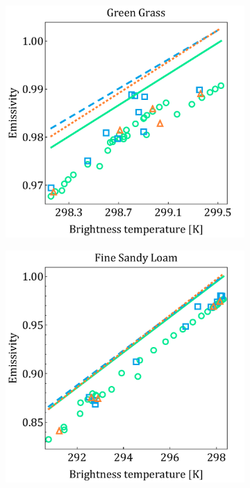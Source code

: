 \begin{figure}[htb]
	\centering
	\vspace{1em}
	\begin{subfigure}[t]{.3\linewidth}
		\centering
		\includegraphics[scale=0.3]{pics/Chapter_03/pivov2.pdf}
		\vspace{-0.1cm}
		\caption{}
		\label{fig:BBradiation}
	\end{subfigure}
	\hspace{1em}
	\begin{subfigure}[t]{.3\linewidth}
		\centering
		\includegraphics[scale=0.3]{pics/Chapter_03/pivov3.pdf}

\end{subfigure}
\end{figure}
